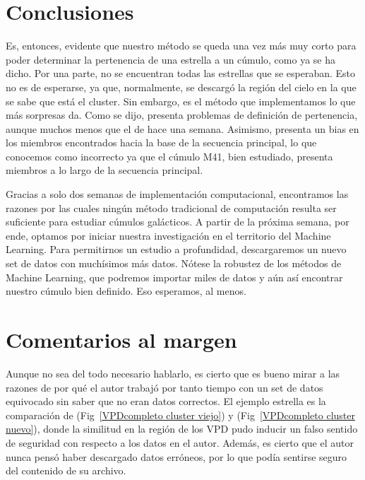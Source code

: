 \documentclass[10pt,twocolumn]{article}
\begin{document}
\section{Conclusiones}

Es, entonces, evidente que nuestro método se queda una vez más muy corto para poder determinar la pertenencia de una estrella a un cúmulo, como ya se ha dicho.
Por una parte, no se encuentran todas las estrellas que se esperaban. Esto no es de esperarse, ya que, normalmente, se descargó la región del cielo en la que
se sabe que está el cluster. Sin embargo, es el método que implementamos lo que más sorpresas da. Como se dijo, presenta problemas de definición de pertenencia, 
aunque muchos menos que el de hace una semana. Asimismo, presenta un bias en los miembros encontrados hacia la base de la secuencia principal, 
lo que conocemos como incorrecto ya que el cúmulo M41, bien estudiado, presenta miembros a lo largo de la secuencia principal. 

Gracias a solo dos semanas de implementación computacional, encontramos las razones por las cuales ningún método tradicional de computación resulta ser
suficiente para estudiar cúmulos galácticos. A partir de la próxima semana, por ende, optamos por iniciar nuestra investigación en el territorio 
del Machine Learning. Para permitirnos un estudio a profundidad, descargaremos un nuevo set de datos con muchísimos más datos. Nótese la robustez
de los métodos de Machine Learning, que podremos importar miles de datos y aún así encontrar nuestro cúmulo bien definido. Eso esperamos, al menos. 




\section*{Comentarios al margen}

Aunque no sea del todo necesario hablarlo, es cierto que es bueno mirar a las razones de por qué el autor trabajó por tanto tiempo con un set de datos
equivocado sin saber que no eran datos correctos. El ejemplo estrella es la comparación de (Fig~\ref{VPDcompleto cluster viejo}) y (Fig~\ref{VPDcompleto cluster nuevo}), 
donde la similitud en la región de los VPD pudo inducir un falso sentido de seguridad con respecto a los datos en el autor. Además, es cierto que el autor
nunca pensó haber descargado datos erróneos, por lo que podía sentirse seguro del contenido de su archivo. 
\end{document}

